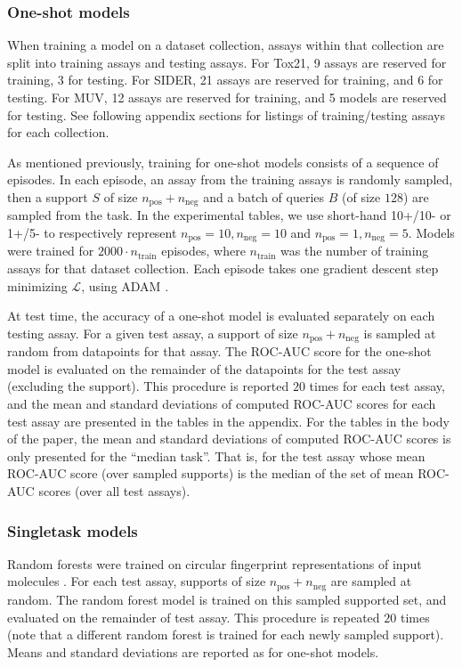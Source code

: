 \documentclass[journal=jacsat,manuscript=article]{achemso}
\begin{document}
\subsubsection{One-shot models}
When training a model on a dataset collection, assays within that collection are split into training assays and testing assays. For Tox21, 9 assays are reserved for training, 3 for testing. For SIDER, 21 assays are reserved for training, and 6 for testing. For MUV, 12 assays are reserved for training, and 5 models are reserved for testing. See following appendix sections for listings of training/testing assays for each collection.

As mentioned previously, training for one-shot models consists of a sequence of episodes. In each episode, an assay from the training assays is randomly sampled, then a support $S$ of size $n_\textrm{pos} + n_\textrm{neg}$ and a batch of queries $B$ (of size $128$) are sampled from the task. In the experimental tables, we use short-hand 10+/10- or 1+/5- to respectively represent $n_\textrm{pos} = 10, n_\textrm{neg}=10$ and $n_\textrm{pos}=1,n_\textrm{neg}=5$. Models were trained for $2000\cdot n_\textrm{train}$ episodes, where $n_\textrm{train}$ was the number of training assays for that dataset collection. Each episode takes one gradient descent step minimizing $\mathcal{L}$, using ADAM \cite{kingma2014adam}.

At test time, the accuracy of a one-shot model is evaluated separately on each testing assay. For a given test assay, a support of size $n_\textrm{pos} + n_\textrm{neg}$ is sampled at random from datapoints for that assay. The ROC-AUC score for the one-shot model is evaluated on the remainder of the datapoints for the test assay (excluding the support). This procedure is reported $20$ times for each test assay, and the mean and standard deviations of computed ROC-AUC scores for each test assay are presented in the tables in the appendix. For the tables in the body of the paper, the mean and standard deviations of computed ROC-AUC scores is only presented for the ``median task''. That is, for the test assay whose mean ROC-AUC score (over sampled supports) is the median of the set of mean ROC-AUC scores (over all test assays).

\subsubsection{Singletask models}
Random forests were trained on circular fingerprint representations of input molecules \cite{rogers2010extended}. For each test assay, supports of size $n_\textrm{pos} + n_\textrm{neg}$ are sampled at random. The random forest model is trained on this sampled supported set, and evaluated on the remainder of test assay. This procedure is repeated $20$ times (note that a different random forest is trained for each newly sampled support). Means and standard deviations are reported as for one-shot models.
\end{document}
